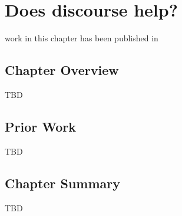 \chapter{Does discourse help?}\label{ch:discourse}

work in this chapter has been published in \newcite{}

\section{Chapter Overview}

TBD

\section{Prior Work}

TBD


\section{Chapter Summary}

TBD

